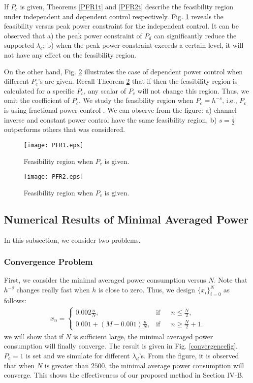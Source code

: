 \documentclass[12pt, draftclsnofoot, journal, letterpaper, onecolumn]{IEEEtran}
\begin{document}
If $P_c$ is given, Theorems \ref{PFR1t} and \ref{PFR2t} describe the feasibility region under independent and dependent control respectively.  Fig. \ref{PFR1} reveals the feasibility versus peak power constraint for the independent control. It can be observed that a) the peak power constraint of $P_d$ can significantly reduce the supported $\lambda_c$; b) when the peak power constraint exceeds a certain level, it will not have any effect on the feasibility region.

On the other hand, Fig. \ref{PFR2} illustrates the case of dependent power control when different $P_c$'s are given. Recall Theorem \ref{PFR2} that if then the feasibility region is calculated for a specific $P_c$, any scalar of $P_c$ will not change this region. Thus, we omit the coefficient of $P_c$. We study the feasibility region when $P_c=h^{-s}$, i.e., $P_c$ is using fractional power control \cite{FPC}. We can observe from the figure: a) channel inverse and constant power control have the same feasibility region, b) $s=\frac{1}{2}$ outperforms others that was considered.



\begin{figure}
\center
\texttt{[image: PFR1.eps]}
\center\caption{Feasibility region when $P_c$ is given.}\label{PFR1}
\end{figure}
\begin{figure}
\center
\texttt{[image: PFR2.eps]}
\center\caption{Feasibility region when $P_c$ is given.}\label{PFR2}
\end{figure}

\subsection{Numerical Results of Minimal Averaged Power}
In this subsection, we consider two problems.

\subsubsection{Convergence Problem}\label{convergence}
First, we consider the minimal averaged power consumption versus $N$. Note that $h^{-\delta}$ changes really fast when $h$ is close to zero. Thus, we design $\{x_i\}_{i=0}^N$ as follows:
\begin{eqnarray*}
x_n=
\begin{cases}
0.002 \frac{n}{N}, & \text{if} \phantom{aaa} n\leq\frac{N}{2},\\
0.001+(M-0.001) \frac{n}{N}, & \text{if} \phantom{aaa} n\geq\frac{N}{2}+1.
\end{cases}
\end{eqnarray*}
we will show that if $N$ is sufficient large, the minimal averaged power consumption will finally converge. The result is given in Fig. \ref{convergencefig}. $P_c=1$ is set and we simulate for different $\lambda_d$'s. From the figure, it is observed that when $N$ is greater than $2500$, the minimal average power consumption will converge. This shows the effectiveness of our proposed method in Section IV-B.
\end{document}

